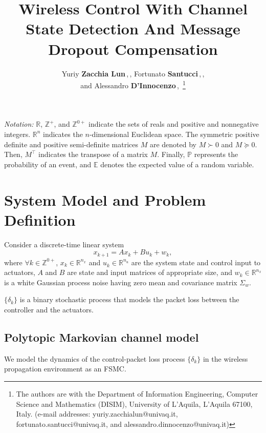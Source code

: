 \documentclass[journal,twoside,web]{ieeecolor}
\title{Wireless Control With Channel State Detection And Message Dropout Compensation}
\author{Yuriy \textbf{Zacchia Lun}\,\textsuperscript{\orcidlink{0000-0002-9408-8773}},\,\IEEEmembership{Member, IEEE}, Fortunato \textbf{Santucci}\,\textsuperscript{\orcidlink{0000-0002-0229-6277}},\,\IEEEmembership{Senior Member, IEEE},\\ and Alessandro \textbf{D'Innocenzo}\,\textsuperscript{\orcidlink{0000-0002-5239-0894}},\,\IEEEmembership{Member, IEEE}
\thanks{The authors are with the 
Department of Information Engineering, Computer Science and Mathematics (DISIM), University of L'Aquila, L'Aquila 67100, Italy. (e-mail addresses:
        {yuriy.zacchialun@univaq.it},\\ {fortunato.santucci@univaq.it}, and {alessandro.dinnocenzo@univaq.it})}%
}
\begin{document}
\maketitle
\thispagestyle{empty}
\pagestyle{empty}

\textit{Notation:} $\mathbb{R}$, $\mathbb{Z}^{+}$, and $\mathbb{Z}^{0+}$ indicate the sets of reals and positive and nonnegative integers. $\mathbb{R}^{n}$ indicates the $n$-dimensional Euclidean space. The symmetric positive definite and positive semi-definite matrices $M$ are denoted by $M\succ 0$ and $M\succeq 0$. Then, $M^{\top}$ indicates the transpose of a matrix $M$. Finally, $\mathbb{P}$ represents the probability of an event, and $\mathbb{E}$ denotes the expected value of a random variable.
\section{System Model and Problem Definition}\label{sec:model}
Consider a discrete-time linear system
\begin{equation}\label{eq:state}
        x_{k+1} = A x_{k} + B u_{k}^{} + w_{k},
\end{equation}
where $\forall k \!\in\! \mathbb{Z}^{0+}$, $x_k\!\in\!\mathbb{R}^{n_x}$ and $u_k^{}\!\in\!\mathbb{R}^{n_u}$ are the system state and control input to actuators, $A$ and $B$ are state and input matrices of appropriate size, and $w_k\!\in\!\mathbb{R}^{n_x}$ is a white Gaussian process noise having zero mean and covariance matrix $\Sigma_w$.

$\{\delta_k\}$ is a binary stochastic process that models the packet loss between the controller and the actuators.

\subsection{Polytopic Markovian channel model}\label{subsec:ptifsmc}
We model the dynamics of the control-packet loss process $\{\delta_k\}$ in the wireless propagation environment as an FSMC. 
\end{document}
